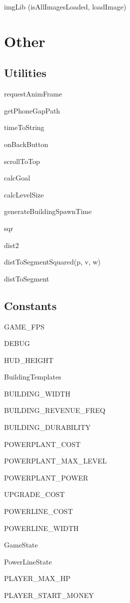 	imgLib (isAllImagesLoaded, loadImage)	

\clearpage

\section{Other}

\subsection*{Utilities}

	requestAnimFrame

	getPhoneGapPath

	timeToString

	onBackButton

	scrollToTop

	calcGoal

	calcLevelSize

	generateBuildingSpawnTime

	sqr

	dist2

	distToSegmentSquared(p, v, w)

	distToSegment


\subsection*{Constants}
	
	GAME\_FPS

	DEBUG

	HUD\_HEIGHT

	BuildingTemplates

	BUILDING\_WIDTH

	BUILDING\_REVENUE\_FREQ

	BUILDING\_DURABILITY

	POWERPLANT\_COST

	POWERPLANT\_MAX\_LEVEL

	POWERPLANT\_POWER

	UPGRADE\_COST

	POWERLINE\_COST

	POWERLINE\_WIDTH

	GameState

	PowerLineState

	PLAYER\_MAX\_HP

	PLAYER\_START\_MONEY
